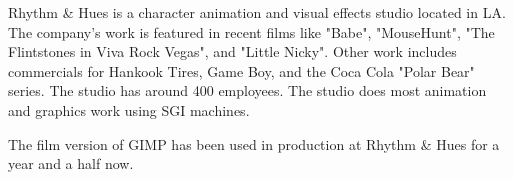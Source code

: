 Rhythm \& Hues is a character animation and visual effects studio located in
LA. The company's work is featured in recent films  like "Babe", "MouseHunt",
"The Flintstones in Viva Rock Vegas", and "Little Nicky". Other work includes
commercials for Hankook Tires, Game Boy, and the Coca Cola "Polar Bear" series.
The studio has around 400 employees. The studio does most animation and
graphics work using SGI machines.

The film version of GIMP has been used in production at Rhythm \& Hues for
a year and a half now.

